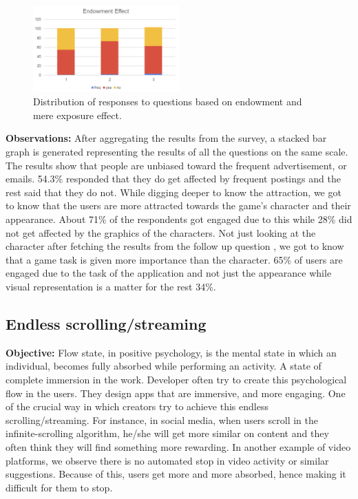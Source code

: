 \documentclass[conference]{IEEEtran}
\begin{document}
\begin{figure}[htbp]
\centerline{\includegraphics[width=0.5\textwidth]{Endowment.png}}
\caption{Distribution of responses to questions based on endowment and mere exposure effect.}
\label{sr}
\end{figure}

\textbf{Observations:} After aggregating the results from the survey, a stacked bar graph is generated representing the results of all the questions on the same scale. The results show that people are unbiased toward the frequent advertisement, or emails. 54.3\% responded that they do  get affected by frequent postings and the rest said that they do not. While digging deeper to know the attraction, we got to know that the users are more attracted towards the game’s character and their appearance. About 71\% of the respondents got engaged due to this while 28\% did not get affected by the graphics of the characters. Not just looking at the character after fetching the results from the follow up question , we got to know that a game task is given more importance than the character. 65\% of users are engaged due to the task of the application and not just the appearance while visual representation is a matter for the rest 34\%.\

\subsection{Endless scrolling/streaming}
\textbf{Objective:} Flow state, in positive psychology, is the mental state in which an individual, becomes fully absorbed while performing an activity. A state of complete immersion in the work. Developer often try to create this psychological flow in the users. They design apps that are immersive, and more engaging. One of the crucial way in which creators try to achieve this endless scrolling/streaming. For instance, in social media, when users scroll in the infinite-scrolling algorithm, he/she will get more similar on content and they often think they will find something more rewarding. In another example of video platforms, we observe there is no automated stop in video activity or similar suggestions. Because of this, users get more and more absorbed, hence making it difficult for them to stop.
\end{document}
